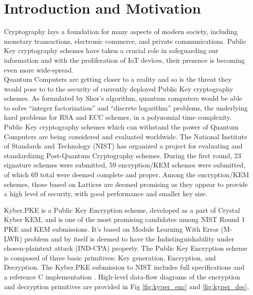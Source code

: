 

\chapter{Introduction and Motivation}

Cryptography lays a foundation for many aspects of modern society, including monetary 
transactions, electronic commerce, and private communications. Public Key cryptography
 schemes have taken a crucial role in safeguarding our information and with the 
 proliferation of IoT devices, their presence is becoming even more wide-spread. \\


Quantum Computers are getting closer to a reality and so is the threat they would pose
 to to the security of currently deployed Public Key cryptography schemes. As formulated
  by Shor’s algorithm, quantum computers would be able to solve “integer factorization”
   and “discrete logarithm” problems, the underlying hard problems for RSA and ECC 
   schemes, in a polynomial time complexity. \\


Public Key cryptography schemes which can withstand the power of Quantum Computers
 are being considered and evaluated worldwide. The National Institute of Standards and 
 Technology (NIST) has organized a project for evaluating and standardizing Post-Quantum
  Cryptography schemes. During the first round, 23 signature schemes were submitted, 59
   encryption/KEM schemes were submitted, of which 69 total were deemed complete and
    proper. Among the encryption/KEM schemes, those based on Lattices are deemed 
    promising as they appear to provide a high level of security, with good performance
     and smaller key size. 


Kyber.PKE\cite{bos2018} is a Public Key Encryption scheme, developed as a part of Crystal Kyber KEM, 
and is one of the most promising candidates among NIST Round 1 PKE and KEM submissions.
 It’s based on Module Learning With Error (M-LWR) problem and by itself is deemed to have
  the Indistinguishability under chosen-plaintext attack (IND-CPA) property. The Public
   Key Encryption scheme is composed of three basic primitives: Key generation, 
   Encryption, and Decryption. The Kyber.PKE submission to NIST includes full
    specifications and a reference C implementation 
    \cite{kyberres}. High-level data-flow diagrams of
     the encryption and decryption primitives are provided in Fig \ref{fig:kyper_enc} and \ref{fig:kyper_dec}.


